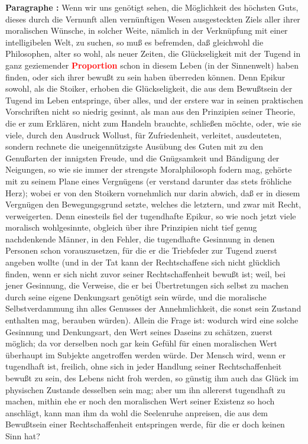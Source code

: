 \documentclass[a4paper,12pt,twoside]{book}
\newcommand{\match}[1]{\textcolor{red}{\textbf{#1}}}
\begin{document}
	\noindent\textbf{Paragraphe : }Wenn wir uns genötigt sehen, die Möglichkeit des höchsten Guts, dieses durch die Vernunft allen vernünftigen Wesen ausgesteckten Ziels aller ihrer moralischen Wünsche, in solcher Weite, nämlich in der Verknüpfung mit einer intelligibelen Welt, zu suchen, so muß es befremden, daß gleichwohl die Philosophen, alter so wohl, als neuer Zeiten, die Glückseligkeit mit der Tugend in ganz geziemender \match{Proportion} schon in diesem Leben (in der Sinnenwelt) haben finden, oder sich ihrer bewußt zu sein haben überreden können. Denn Epikur sowohl, als die Stoiker, erhoben die Glückseligkeit, die aus dem Bewußtsein der Tugend im Leben entspringe, über alles, und der erstere war in seinen praktischen Vorschriften nicht so niedrig gesinnt, als man aus den Prinzipien seiner Theorie, die er zum Erklären, nicht zum Handeln brauchte, schließen möchte, oder, wie sie viele, durch den Ausdruck Wollust, für Zufriedenheit, verleitet, ausdeuteten, sondern rechnete die uneigennützigste Ausübung des Guten mit zu den Genußarten der innigsten Freude, und die Gnügsamkeit und Bändigung der Neigungen, so wie sie immer der strengste Moralphilosoph fodern mag, gehörte mit zu seinem Plane eines Vergnügens (er verstand  darunter das stets fröhliche Herz); wobei er von den Stoikern vornehmlich nur darin abwich, daß er in diesem Vergnügen den Bewegungsgrund setzte, welches die letztern, und zwar mit Recht, verweigerten. Denn einesteils fiel der tugendhafte Epikur, so wie noch jetzt viele moralisch wohlgesinnte, obgleich über ihre Prinzipien nicht tief genug nachdenkende Männer, in den Fehler, die tugendhafte Gesinnung in denen Personen schon vorauszusetzen, für die er die Triebfeder zur Tugend zuerst angeben wollte (und in der Tat kann der Rechtschaffene sich nicht glücklich finden, wenn er sich nicht zuvor seiner Rechtschaffenheit bewußt ist; weil, bei jener Gesinnung, die Verweise, die er bei Übertretungen sich selbst zu machen durch seine eigene Denkungsart genötigt sein würde, und die moralische Selbstverdammung ihn alles Genusses der Annehmlichkeit, die sonst sein Zustand enthalten mag, berauben würden). Allein die Frage ist: wodurch wird eine solche Gesinnung und Denkungsart, den Wert seines Daseins zu schätzen, zuerst möglich; da vor derselben noch gar kein Gefühl für einen moralischen Wert überhaupt im Subjekte angetroffen werden würde. Der Mensch wird, wenn er tugendhaft ist, freilich, ohne sich in jeder Handlung seiner Rechtschaffenheit bewußt zu sein, des Lebens nicht froh werden, so günstig ihm auch das Glück im physischen Zustande desselben sein mag; aber um ihn allererst tugendhaft zu machen, mithin ehe er noch den moralischen Wert seiner Existenz so hoch anschlägt, kann man ihm da wohl die Seelenruhe anpreisen, die aus dem Bewußtsein einer Rechtschaffenheit entspringen werde, für die er doch keinen Sinn hat? 
	
\end{document}

